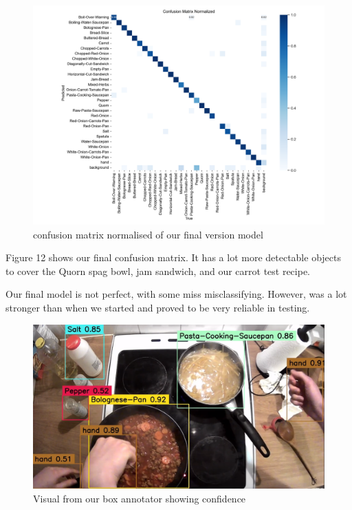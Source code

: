 \documentclass{article}
\begin{document}
\begin{figure}[h!]
    \centering
    \includegraphics[width=1\linewidth]{assets/confusion_matrix_normalized-Version-6.png}
    \caption{confusion matrix normalised of our final version model}
    \label{fig:enter-label}
\end{figure}

Figure 12 shows our final confusion matrix. It has a lot more detectable objects to cover the Quorn spag bowl, jam sandwich, and our carrot test recipe.

Our final model is not perfect, with some miss misclassifying. However, was a lot stronger than when we started and proved to be very reliable in testing.

\begin{figure}[h!]
    \centering
    \includegraphics[width=1\linewidth]{assets/BoxSelector-Chop-Chop.png}
    \caption{Visual from our box annotator showing confidence}
    \label{fig:enter-label}
\end{figure}
\end{document}
